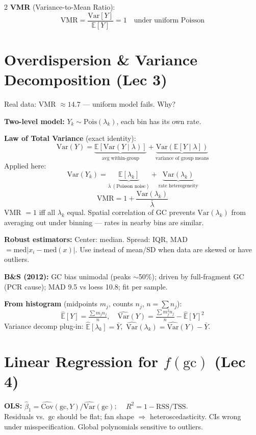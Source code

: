 \documentclass[12pt,a4paper]{article}
\newcommand{\E}{\mathbb{E}}
\newcommand{\Var}{\mathrm{Var}}
\newcommand{\med}{\mathrm{med}}
\newcommand{\gc}{\text{gc}}
\begin{document}
\begin{multicols}{2}
\textbf{VMR} (Variance-to-Mean Ratio):
\[
  \text{VMR} = \frac{\Var[Y]}{\E[Y]} = 1 \quad \text{under uniform Poisson}
\]

\section*{Overdispersion \& Variance Decomposition (Lec 3)}

Real data: VMR $\approx 14.7$ — uniform model fails. Why?

\textbf{Two-level model:} $Y_k \sim \text{Pois}(\lambda_k)$, each bin has its own rate.

\textbf{Law of Total Variance} (exact identity):
\[
  \Var(Y) = \underbrace{\E[\Var(Y\!\mid\!\lambda)]}_{\text{avg within-group}} + \underbrace{\Var(\E[Y\!\mid\!\lambda])}_{\text{variance of group means}}
\]
Applied here:
\[
  \boxed{\Var(Y_k) = \underbrace{\E[\lambda_k]}_{\bar\lambda\ (\text{Poisson noise})} + \underbrace{\Var(\lambda_k)}_{\text{rate heterogeneity}}}
\]
\[
  \text{VMR} = 1 + \frac{\Var(\lambda_k)}{\bar\lambda}
\]
VMR $=1$ iff all $\lambda_k$ equal. Spatial correlation of GC prevents $\Var(\lambda_k)$ from averaging out under binning — rates in nearby bins are similar.

\textbf{Robust estimators:} Center: median. Spread: IQR, MAD $= \med|x_i - \med(x)|$. Use instead of mean/SD when data are skewed or have outliers.

\textbf{B\&S (2012):} GC bias unimodal (peaks $\sim$50\%); driven by full-fragment GC (PCR cause); MAD 9.5 vs loess 10.8; fit per sample.

\textbf{From histogram} (midpoints $m_j$, counts $n_j$, $n=\sum n_j$):
\[
  \hat{\E}[Y] = \tfrac{\sum m_j n_j}{n}, \quad
  \widehat{\Var}(Y) = \tfrac{\sum m_j^2 n_j}{n} - \hat{\E}[Y]^2
\]
Variance decomp plug-in: $\hat{\E}[\lambda_k] = \bar{Y}$,\ $\widehat{\Var}(\lambda_k) = \widehat{\Var}(Y) - \bar{Y}$.

\section*{Linear Regression for $f(\gc)$ (Lec 4)}

\textbf{OLS:} $\hat\beta_1 = \widehat{\text{Cov}}(\gc,Y)/\widehat{\Var}(\gc)$; $\quad R^2 = 1-\text{RSS}/\text{TSS}$.\\
Residuals vs.\ $\gc$ should be flat; fan shape $\Rightarrow$ heteroscedasticity. CIs wrong under misspecification. Global polynomials sensitive to outliers.


\end{multicols}
\end{document}
